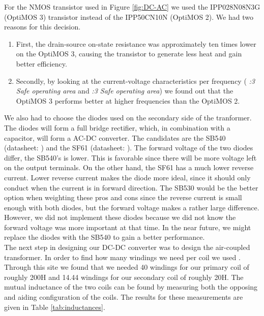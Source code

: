 \documentclass[final]{scrreprt} %
\begin{document}
For the NMOS transistor used in Figure \ref{fig:DC-AC} we used the IPP028N08N3G (OptiMOS 3) transistor instead of the IPP50CN10N (OptiMOS 2).
We had two reasons for this decision.
\begin{enumerate}
\item First, the drain-source on-state resistance was approximately ten times lower on the OptiMOS 3, causing the transistor to generate less heat and gain better efficiency.
\item Secondly, by looking at the current-voltage characteristics per frequency (\cite{OptiMOS2} \emph{:3 Safe operating area} and \cite{OptiMOS3} \emph{:3 Safe operating area}) we found out that the OptiMOS 3 performs better at higher frequencies than the OptiMOS 2.
\end{enumerate}

We also had to choose the diodes used on the secondary side of the tranformer. 
The diodes will form a full bridge rectifier, which, in combination with a capacitor, will form a AC-DC converter.
The candidates are the SB540 (datasheet: \cite{SB540}) and the SF61 (datasheet: \cite{SF61}).
The forward voltage of the two diodes differ, the SB540's is lower. 
This is favorable since there will be more voltage left on the output terminals.
On the other hand, the SF61 has a much lower reverse current. 
Lower reverse current makes the diode more ideal, since it should only conduct when the current is in forward direction.
The SB530 would be the better option when weighting these pros and cons since the reverse current is small enough with both diodes, but the forward voltage makes a rather large difference.
However, we did not implement these diodes because we did not know the forward voltage was more important at that time.
In the near future, we might replace the diodes with the SB540 to gain a better performance. \\




The next step in designing our DC-DC converter was to design the air-coupled transformer. 
In order to find how many windings we need per coil we used \cite{windings}.
Through this site we found that we needed 40 windings for our primary coil of roughly \unit{200}{\micro}H and 14.44 windings for our secondary coil of roughly \unit{20}{\micro}H.
The mutual inductance of the two coils can be found by measuring both the opposing and aiding configuration of the coils. 
The results for these measurements are given in Table \ref{tab:inductances}.
\end{document}
